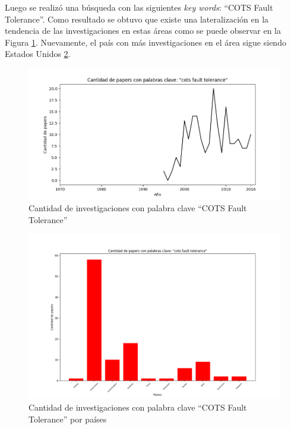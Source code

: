 Luego se realizó una búsqueda con las siguientes \textit{key words}: ``COTS Fault Tolerance''. Como resultado se obtuvo que existe una lateralización en la tendencia de las investigaciones en estas
áreas como se puede observar en la Figura \ref{fig:ant4}. Nuevamente, el país con más investigaciones
en el área sigue siendo Estados Unidos \ref{fig:ant5}. 


\begin{figure}[h!]
 \centering
 \includegraphics[scale=0.6]{images/Secciones/antecedentes/Cantidad_paper-COTS_fault_tolerance.png}
  \caption{Cantidad de investigaciones con palabra clave ``COTS Fault Tolerance'' }
\label{fig:ant4}
\end{figure}


\begin{figure}[h!]
 \centering
 \includegraphics[scale=0.5]{images/Secciones/antecedentes/Cantidad_paper-COTS_fault_tolerance-Country.png}
  \caption{Cantidad de investigaciones con palabra clave ``COTS Fault Tolerance'' por países}
\label{fig:ant5}
\end{figure}

